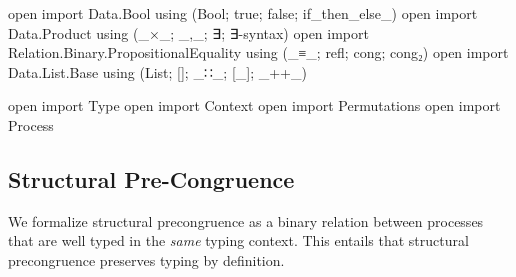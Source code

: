 \begin{code}[hide]
open import Data.Bool using (Bool; true; false; if_then_else_)
open import Data.Product using (_×_; _,_; ∃; ∃-syntax)
open import Relation.Binary.PropositionalEquality using (_≡_; refl; cong; cong₂)
open import Data.List.Base using (List; []; _∷_; [_]; _++_)

open import Type
open import Context
open import Permutations
open import Process
\end{code}

\subsection{Structural Pre-Congruence}
\label{sec:congruence-agda}

We formalize structural precongruence as a binary relation between processes
that are well typed in the \emph{same} typing context. This entails that
structural precongruence preserves typing by definition.

